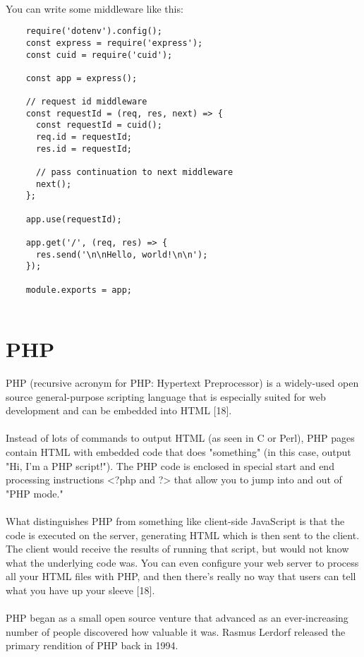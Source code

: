 \documentclass[a4paper, onecolumn, oneside, 11pt, wide, floatssmall]{mwrep}
\begin{document}
\paragraph{}
You can write some middleware like this:
\begin{lstlisting}
    require('dotenv').config();
    const express = require('express');
    const cuid = require('cuid');
    
    const app = express();
    
    // request id middleware
    const requestId = (req, res, next) => {
      const requestId = cuid();
      req.id = requestId;
      res.id = requestId;
    
      // pass continuation to next middleware
      next();
    };
    
    app.use(requestId);
    
    app.get('/', (req, res) => {
      res.send('\n\nHello, world!\n\n');
    });
    
    module.exports = app;
    
\end{lstlisting}
\newpage

\section{PHP}
PHP (recursive acronym for PHP: Hypertext Preprocessor) is a widely-used open source general-purpose scripting language that is especially suited for web development and can be embedded into HTML [18].
\paragraph{}
Instead of lots of commands to output HTML (as seen in C or Perl), PHP pages contain HTML with embedded code that does "something" (in this case, output "Hi, I'm a PHP script!"). The PHP code is enclosed in special start and end processing instructions <?php and ?> that allow you to jump into and out of "PHP mode."
\paragraph{}
What distinguishes PHP from something like client-side JavaScript is that the code is executed on the server, generating HTML which is then sent to the client. The client would receive the results of running that script, but would not know what the underlying code was. You can even configure your web server to process all your HTML files with PHP, and then there's really no way that users can tell what you have up your sleeve [18].
\paragraph{}
PHP began as a small open source venture that advanced as an ever-increasing number of people discovered how valuable it was. Rasmus Lerdorf released the primary rendition of PHP back in 1994.
\end{document}
